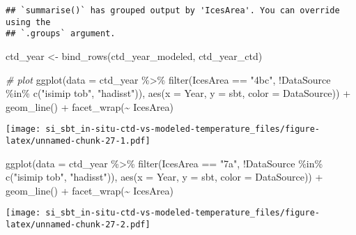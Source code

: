 \documentclass[
]{article}
\newenvironment{Shaded}{\begin{snugshade}}{\end{snugshade}}
\newcommand{\AttributeTok}[1]{\textcolor[rgb]{0.77,0.63,0.00}{#1}}
\newcommand{\CommentTok}[1]{\textcolor[rgb]{0.56,0.35,0.01}{\textit{#1}}}
\newcommand{\FunctionTok}[1]{\textcolor[rgb]{0.00,0.00,0.00}{#1}}
\newcommand{\NormalTok}[1]{#1}
\newcommand{\OtherTok}[1]{\textcolor[rgb]{0.56,0.35,0.01}{#1}}
\newcommand{\SpecialCharTok}[1]{\textcolor[rgb]{0.00,0.00,0.00}{#1}}
\newcommand{\StringTok}[1]{\textcolor[rgb]{0.31,0.60,0.02}{#1}}
\begin{document}
\begin{verbatim}
## `summarise()` has grouped output by 'IcesArea'. You can override using the
## `.groups` argument.
\end{verbatim}

\begin{Shaded}
\begin{Highlighting}[]
\NormalTok{ctd\_year }\OtherTok{\textless{}{-}} \FunctionTok{bind\_rows}\NormalTok{(ctd\_year\_modeled, ctd\_year\_ctd)}

\CommentTok{\# plot}
\FunctionTok{ggplot}\NormalTok{(}\AttributeTok{data =}\NormalTok{ ctd\_year }\SpecialCharTok{\%\textgreater{}\%} \FunctionTok{filter}\NormalTok{(IcesArea }\SpecialCharTok{==} \StringTok{"4bc"}\NormalTok{, }\SpecialCharTok{!}\NormalTok{DataSource }\SpecialCharTok{\%in\%} \FunctionTok{c}\NormalTok{(}\StringTok{"isimip tob"}\NormalTok{, }\StringTok{"hadisst"}\NormalTok{)), }\FunctionTok{aes}\NormalTok{(}\AttributeTok{x =}\NormalTok{ Year, }\AttributeTok{y =}\NormalTok{ sbt, }\AttributeTok{color =}\NormalTok{ DataSource)) }\SpecialCharTok{+} \FunctionTok{geom\_line}\NormalTok{() }\SpecialCharTok{+} \FunctionTok{facet\_wrap}\NormalTok{(}\SpecialCharTok{\textasciitilde{}}\NormalTok{ IcesArea)}
\end{Highlighting}
\end{Shaded}

\texttt{[image: si\_sbt\_in-situ-ctd-vs-modeled-temperature\_files/figure-latex/unnamed-chunk-27-1.pdf]}

\begin{Shaded}
\begin{Highlighting}[]
\FunctionTok{ggplot}\NormalTok{(}\AttributeTok{data =}\NormalTok{ ctd\_year }\SpecialCharTok{\%\textgreater{}\%} \FunctionTok{filter}\NormalTok{(IcesArea }\SpecialCharTok{==} \StringTok{"7a"}\NormalTok{, }\SpecialCharTok{!}\NormalTok{DataSource }\SpecialCharTok{\%in\%} \FunctionTok{c}\NormalTok{(}\StringTok{"isimip tob"}\NormalTok{, }\StringTok{"hadisst"}\NormalTok{)), }\FunctionTok{aes}\NormalTok{(}\AttributeTok{x =}\NormalTok{ Year, }\AttributeTok{y =}\NormalTok{ sbt, }\AttributeTok{color =}\NormalTok{ DataSource)) }\SpecialCharTok{+} \FunctionTok{geom\_line}\NormalTok{() }\SpecialCharTok{+} \FunctionTok{facet\_wrap}\NormalTok{(}\SpecialCharTok{\textasciitilde{}}\NormalTok{ IcesArea)}
\end{Highlighting}
\end{Shaded}

\texttt{[image: si\_sbt\_in-situ-ctd-vs-modeled-temperature\_files/figure-latex/unnamed-chunk-27-2.pdf]}
\end{document}
